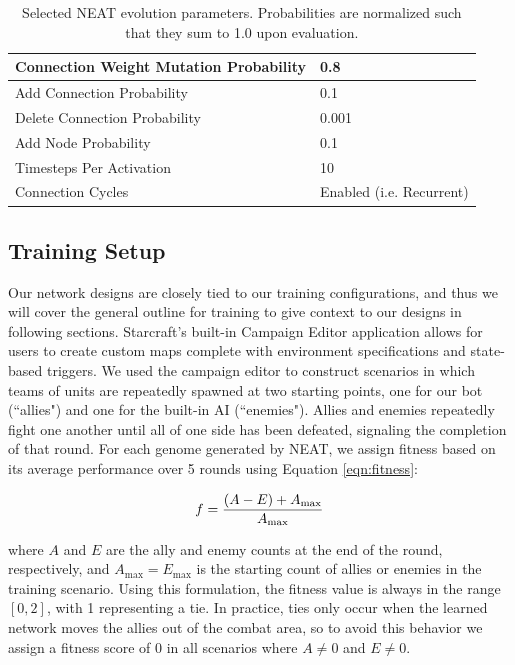\documentclass[a4paper]{article}
\begin{document}
\begin{table}
\centering
\begin{tabular}{|l|l|}
	\hline
	Connection Weight Mutation Probability & 0.8\\ \hline
	Add Connection Probability & 0.1\\ \hline
	Delete Connection Probability & 0.001\\ \hline
	Add Node Probability & 0.1\\ \hline
	Timesteps Per Activation & 10\\ \hline
	Connection Cycles & Enabled (i.e. Recurrent)\\ \hline
\end{tabular}
\caption{Selected NEAT evolution parameters. Probabilities are normalized such that they sum to 1.0 upon evaluation.}
\label{tab:neat_params_specific}
\end{table}

\subsection{Training Setup}

Our network designs are closely tied to our training configurations, and thus we will cover the general outline for training to give context to our designs in following sections. Starcraft's built-in Campaign Editor application allows for users to create custom maps complete with environment specifications and state-based triggers. We used the campaign editor to construct scenarios in which teams of units are repeatedly spawned at two starting points, one for our bot (``allies") and one for the built-in AI (``enemies"). Allies and enemies repeatedly fight one another until all of one side has been defeated, signaling the completion of that round. For each genome generated by NEAT, we assign fitness based on its average performance over 5 rounds using Equation \ref{eqn:fitness}:

\begin{equation}
f = \frac{(A - E) + A_\mathrm{max}}{A_\mathrm{max}}\\
\label{eqn:fitness}
\end{equation}

where $A$ and $E$ are the ally and enemy counts at the end of the round, respectively, and $A_\mathrm{max} = E_\mathrm{max}$ is the starting count of allies or enemies in the training scenario. Using this formulation, the fitness value is always in the range $[0,2]$, with 1 representing a tie. In practice, ties only occur when the learned network moves the allies out of the combat area, so to avoid this behavior we assign a fitness score of 0 in all scenarios where $A \neq 0$ and $E \neq 0$.
\end{document}
